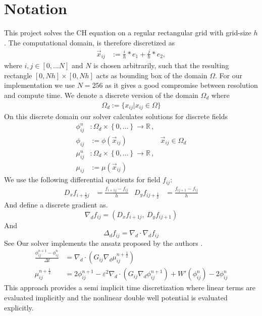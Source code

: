\documentclass{mimosis}
\begin{document}
\section{Notation}
\label{sec:orgd993985}
This project solves the CH equation on a regular rectangular grid with grid-size \(h\). The computational domain, is therefore discretized as
\begin{align}
\label{eq:4}
\vec{x}_{ij} &:= \frac{i}{h} * e_{1} + \frac{j}{h} * e_2,
\end{align}
where \(i,j \in [0 , \dots N]\) and \(N\) is chosen arbitrarily, such that the resulting rectangle \([0 , Nh] \times [0,Nh]\) acts as bounding box of the domain \(\Omega\). For our implementation we use \(N=256\) as it gives a good compromise between resolution and compute time. We denote a discrete version of the domain \(\Omega_d\) where
\begin{align}
\label{eq:8}
\Omega_d := \{x_{ij} | x_{ij} \in \Omega\}
\end{align}
On this discrete domain our solver calculates solutions for discrete fields
\begin{align}
\label{eq:5}
\phi_{ij}^n &: \Omega_d \times \left\{ 0, \dots  \right\} \to \mathbb{R} \,,\\
\phi_{ij} &:= \phi(\vec{x}_{ij}) & \vec{x}_{ij} \in \Omega_{d} \\
\mu_{ij}^n &: \Omega_d \times \left\{ 0, \dots \right\} \to \mathbb{R} \,, \\
\mu_{ij} &:= \mu(\vec{x}_{ij})
\end{align}
We use the following differential quotients for field \(f_{ij}\):
\begin{align}
D_xf_{i+\frac{1}{2} j} &= \frac{f_{i+1j} - f_{ij}}{h} & D_yf_{ij+\frac{1}{2}} &= \frac{f_{ij+1} - f_{ij}}{h}
\end{align}
And define a discrete gradient as.
\begin{equation}
\nabla_d f_{ij} = (D_x f_{i+1j} , \ D_y f_{ij+1})
\end{equation}
And
\begin{equation}
\Delta_d f_{ij} =  \nabla_{d} \cdot \nabla_d f_{ij}
\end{equation}
See \autocite{Ulmer_CHRelaxed_2024}
Our solver implements the ansatz proposed by the authors \autocite{SHIN20117441}.
\begin{equation}
\label{eq:ansatz}
\begin{aligned}
\frac{\phi_{ij}^{n+1} - \phi_{ij}^n}{\Delta t}  &=  \nabla _d \cdot (G_{ij} \nabla_d \mu_{ij}^{n+\frac{1}{2}} )  \\
 \mu_{ij}^{n+\frac{1}{2}} &= 2\phi_{ij}^{n+1} - \varepsilon^2  \nabla_d \cdot  (G_{ij} \nabla _d \phi_{ij}^{n+1} ) + W'(\phi_{ij}^n) - 2\phi _{ij}^n
\end{aligned}
\end{equation}
This approach provides a semi implicit time discretization where linear terms are evaluated implicitly and the nonlinear double well potential is evaluated explicitly.
\end{document}
